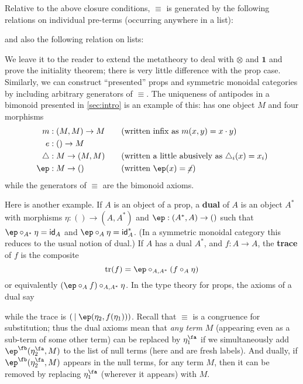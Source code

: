 \documentclass{book}
\def\tr{\mathrm{tr}}
\def\idfunc{\mathsf{id}}
\let\types\vdash
\def\one{\mathbf{1}}
\def\ott{\mathord{\star}}%
\let\tensor\otimes
\def\tpair#1#2{\text{\textlquill} #1,#2 \text{\textrquill}}%
\begin{document}
Relative to the above closure conditions, $\equiv$ is generated by the following relations on individual pre-terms (occurring anywhere in a list):
and also the following relation on lists:

We leave it to the reader to extend the metatheory to deal with $\tensor$ and $\one$ and prove the initiality theorem; there is very little difference with the prop case.
Similarly, we can construct ``presented'' props and symmetric monoidal categories by including arbitrary generators of $\equiv$.
The uniqueness of antipodes in a bimonoid presented in \cref{sec:intro} is an example of this: \cG has one object $M$ and four morphisms
\begin{alignat*}{2}
m&:(M,M)\to M &&\quad\text{(written infix as $m(x,y) = x\cdot y$)}\\
e&:()\to M\\
\triangle&:M\to (M,M) &&\quad\text{(written a little abusively as $\triangle_i(x) = x_i$)}\\
\ep &:M\to () &&\quad\text{(written $\ep(x) = \cancel{x}$)}
\end{alignat*}
while the generators of $\equiv$ are the bimonoid axioms.

Here is another example.
If $A$ is an object of a prop, a \textbf{dual} of $A$ is an object $A^*$ with morphisms $\eta:()\to (A,A^*)$ and $\ep:(A^*,A)\to ()$ such that $\ep \circ_{A^*} \eta = \idfunc_A$ and $\ep \circ_{A} \eta = \idfunc_A^*$.
(In a symmetric monoidal category this reduces to the usual notion of dual.)
If $A$ has a dual $A^*$, and $f:A\to A$, the \textbf{trace} of $f$ is the composite
\[ \tr(f) = \ep \circ_{A,A^*} (f \circ_A \eta) \]
or equivalently $(\ep \circ_A f)\circ_{A,A^*} \eta$.
In the type theory for props, the axioms of a dual say
while the trace is $(\,\mid \ep(\eta_2,f(\eta_1)))$.
Recall that $\equiv$ is a congruence for substitution; thus the dual axioms mean that \emph{any term} $M$ (appearing even as a sub-term of some other term) can be replaced by $\eta_1^\fa$ if we simultaneously add $\ep^\fb(\eta_2^\fa,M)$ to the list of null terms (here \fa and \fb are fresh labels).
And dually, if $\ep^\fb(\eta_2^\fa,M)$ appears in the null terms, for any term $M$, then it can be removed by replacing $\eta_1^\fa$ (wherever it appears) with $M$.
\end{document}
